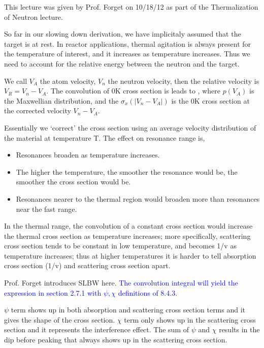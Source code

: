 \documentclass{school-22.211-notes}
\begin{document}
\clearpage
{} %
This lecture was given by Prof. Forget on 10/18/12 as part of the Thermalization of Neutron lecture. 
 
So far in our slowing down derivation, we have implicitaly assumed that the target is at rest. In reactor applications, thermal agitation is always present for the temperature of interest, and it increases as temperature increases. Thus we need to account for the relative energy between the neutron and the target. 

We call $V_A$ the atom velocity, $V_n$ the neutron velocity, then the relative velocity is $V_R = V_n - V_A$. The convolution of 0K cross section is leads to , 
where $p(V_A)$ is the Maxwellian distribution, and the $\sigma_x(|V_n - V_A|)$ is the 0K cross section at the corrected velocity $V_n - V_A$. 

Essentially we `correct' the cross section using an average velocity distribution of the material at temperature T. The effect on resonance range is, 
\begin{itemize}
\item Resonances broaden as temperature increases. 
\item The higher the temperature, the smoother the resonance would be, the smoother the cross section would be. 
\item Resonances nearer to the thermal region would broaden more than resonances near the fast range. 
\end{itemize}

In the thermal range, the convolution of a constant cross section would increase the thermal cross section as temperature increases; more specifically, scattering cross section tends to be constant in low temperature, and becomes 1/v as temperature increases; thus at higher temperatures it is harder to tell absorption cross section (1/v) and scattering cross section apart. 

Prof. Forget introduces SLBW here. \textcolor{blue}{The convolution integral will yield the expression in section 2.7.1 with $\psi, \chi$ definitions of 8.4.3}. 

$\psi$ term shows up in both absorption and scattering cross section terms and it gives the shape of the cross section. $\chi$ term only shows up in the scattering cross section and it represents the interference effect. The sum of $\psi$ and $\chi$ results in the dip before peaking that always shows up in the scattering cross section. 
\end{document}

